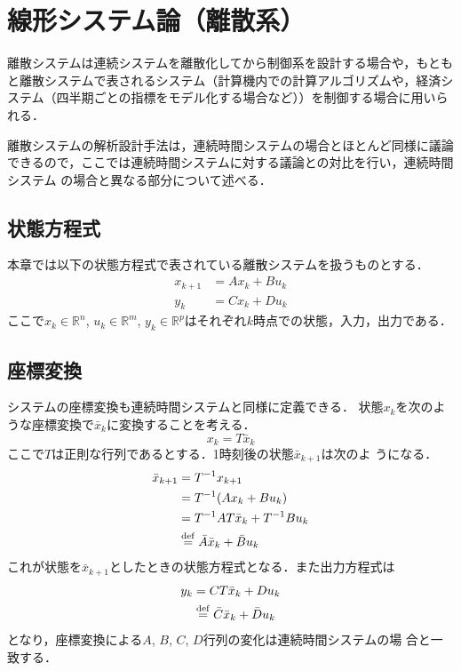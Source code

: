 \chapter{線形システム論（離散系）}

離散システムは連続システムを離散化してから制御系を設計する場合や，もともと離散システムで表されるシステム（計算機内での計算アルゴリズムや，経済システム（四半期ごとの指標をモデル化する場合など））を制御する場合に用いられる．

離散システムの解析設計手法は，連続時間システムの場合とほとんど同様に議論できるので，ここでは連続時間システムに対する議論との対比を行い，連続時間システム
の場合と異なる部分について述べる．
\section{状態方程式}
本章では以下の状態方程式で表されている離散システムを扱うものとする．
\begin{align}
 x_{k+1} &= A x_k + B u_k \label{d_state_eq} \\
 y_k     &= C x_k + D u_k \label{d_output_eq}
\end{align}
ここで$x_k \in \mathbb{R}^n$, $u_k \in \mathbb{R}^m $, $y_k \in
\mathbb{R}^p $はそれぞれ$k$時点での状態，入力，出力である．
\section{座標変換}
システムの座標変換も連続時間システムと同様に定義できる．
状態$x_k$を次のような座標変換で$\bar{x}_k$に変換することを考える．
\begin{equation}
 x_k = T \bar{x}_k
\end{equation}
ここで$T$は正則な行列であるとする．1時刻後の状態$\bar{x}_{k+1}$は次のよ
うになる．
\begin{align}
 \bar{x}_{k+1} &= T^{-1} x_{k+1} \nonumber \\
               &= T^{-1} ( A x_k + B u_k) \nonumber \\
               &= T^{-1} A T \bar{x}_k + T^{-1} B u_k \nonumber \\
               &\stackrel{\rm def}{=} \bar{A} \bar{x}_k + \bar{B} u_k
\end{align}
これが状態を$\bar{x}_{k+1}$としたときの状態方程式となる．また出力方程式は
\begin{align}
 y_k &= C T \bar{x}_k + D u_k \nonumber \\
     &\stackrel{\rm def}{=} \bar{C} \bar{x}_k + \bar{D} u_k
\end{align}
となり，座標変換による$A$, $B$, $C$, $D$行列の変化は連続時間システムの場
合と一致する．
